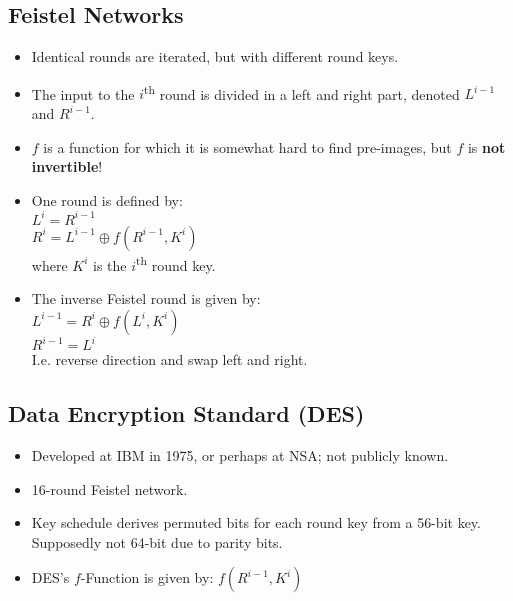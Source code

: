 \documentclass[a4paper]{scrartcl}
\newcommand{\ts}{\textsuperscript}
\begin{document}
\subsection*{Feistel Networks}

\begin{itemize}
\item Identical rounds are iterated, but with different round keys.
\item The input to the $i$\ts{th} round is divided in a left and right part, denoted $L^{i-1}$ and $R^{i-1}$.
\item $f$ is a function for which it is somewhat hard to find pre-images, but $f$ is \textbf{not invertible}!
\item One round is defined by:\\ 
$L^i = R^{i-1}$\\$R^i = L^{i-1} \oplus f(R^{i-1}, K^i)$\\
where $K^i$ is the $i$\ts{th} round key.
\item The inverse Feistel round is given by:\\ 
$L^{i-1} = R^i \oplus f(L^i, K^i)$\\$R^{i-1} = L^i$\\
I.e. reverse direction and swap left and right.
\end{itemize}

\subsection*{Data Encryption Standard (DES)}
\begin{itemize}
\item Developed at IBM in 1975, or perhaps at NSA; not publicly known.
\item 16-round Feistel network.
\item Key schedule derives permuted bits for each round key from a 56-bit key. Supposedly not 64-bit due to parity bits.
\item DES's $f$-Function is given by: $f(R^{i-1}, K^i)$
\end{itemize}
\end{document}
